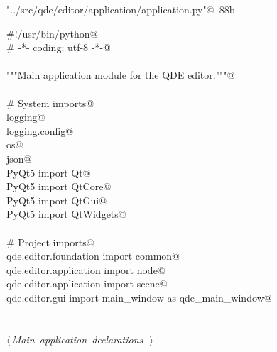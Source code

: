 \documentclass[
    a4paper,      %
    10pt,         %
    openright,    %
    notitlepage,  %
    parskip=half, %
]{scrreprt}       %
\theoremstyle{definition}                    %
\begin{document}
\begin{flushleft} \small
\begin{minipage}{\linewidth}\label{scrap139}\raggedright\small
{} \verb@"../src/qde/editor/application/application.py"@\nobreak\ {\footnotesize {88b}}$\equiv$
\vspace{-1ex}
\begin{list}{}{} \item
\mbox{}\lstinline@#!/usr/bin/python@\\
\mbox{}\lstinline@# -*- coding: utf-8 -*-@\\
\mbox{}\lstinline@@\\
\mbox{}\lstinline@"""Main application module for the QDE editor."""@\\
\mbox{}\lstinline@@\\
\mbox{}\lstinline@# System imports@\\
\mbox{}\lstinline@import logging@\\
\mbox{}\lstinline@import logging.config@\\
\mbox{}\lstinline@import os@\\
\mbox{}\lstinline@import json@\\
\mbox{}\lstinline@from PyQt5 import Qt@\\
\mbox{}\lstinline@from PyQt5 import QtCore@\\
\mbox{}\lstinline@from PyQt5 import QtGui@\\
\mbox{}\lstinline@from PyQt5 import QtWidgets@\\
\mbox{}\lstinline@@\\
\mbox{}\lstinline@# Project imports@\\
\mbox{}\lstinline@from qde.editor.foundation import common@\\
\mbox{}\lstinline@from qde.editor.application import node@\\
\mbox{}\lstinline@from qde.editor.application import scene@\\
\mbox{}\lstinline@from qde.editor.gui import main_window as qde_main_window@\\
\mbox{}\lstinline@@\\
\mbox{}\lstinline@@\\
\mbox{}\lstinline@@\hbox{$\langle\,${\itshape Main application declarations}\nobreak\ {\footnotesize {}}$\,\rangle$}\lstinline@@\\
\mbox{}\lstinline@@{\NWsep}
\end{list}
\vspace{-1.5ex}
\footnotesize
\begin{list}{}{\setlength{\itemsep}{-\parsep}\setlength{\itemindent}{-\leftmargin}}

\item{}
\end{list}
\end{minipage}\vspace{4ex}
\end{flushleft}
\end{document}
